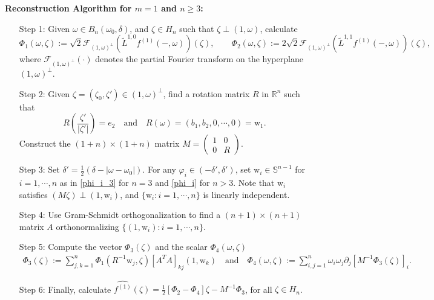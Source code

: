 \documentclass[11pt,a4paper,reqno]{amsart}
\newcommand{\Rn}{\mathbb{R}^n}
\newcommand{\om}{\omega}
\newcommand{\sn}{\mathbb{S}^{n-1}}
\newcommand{\w}{\mathrm{w}}
\begin{document}
	\noindent \textbf{Reconstruction Algorithm for $m = 1$ and $n\geq 3$:}
	\begin{enumerate}\setlength\itemsep{3mm}
		\item[Step 1:] Given $\om \in B_n(\om_0,\delta)$, and $\zeta \in H_n$ such that $\zeta \perp (1,\om)$, calculate
		\[  \Phi_1 (\om,\zeta):=  \sqrt{2} \mathcal{F}_{(1,\om)^{\perp}}(\tilde{L}^{1,0}f^{(1)}(-,\om))(\zeta), \qquad
		\Phi_2 (\om,\zeta):= 2\sqrt{2} \mathcal{F}_{(1,\om)^{\perp}}(\tilde{L}^{1,1}f^{(1)}(-,\om))(\zeta),    \]
		where $\mathcal{F}_{(1,\om)^{\perp}}(\cdot)$ denotes the partial Fourier transform on the hyperplane $(1,\om)^{\perp}$.
		
		
		
		\item[Step 2:] Given $\zeta = (\zeta_0,\zeta') \in (1,\om)^{\perp}$, find a rotation matrix $R$ in $\Rn$ such that
		\[
		R\left(\frac{\zeta'}{|\zeta'|}\right) = e_2 \quad \mbox{and}\quad 
		R(\om) = (b_1,b_2,0,\cdots,0)=\w_1.
		\] 
		Construct the $(1+n)\times(1+n)$ matrix 
		$M = \begin{pmatrix}
			1 &0\\ 0 &R
		\end{pmatrix}$.
		
	
		
		\item[Step 3:]  Set $\delta' = \frac{1}{2}\left(\delta-|\om-\om_0|\right)$. For any $\varphi_i \in (-\delta',\delta')$, set $\w_i \in \sn$ for $i=1,\cdots,n$ as in \eqref{phi_i_3} for $n=3$ and \eqref{phi_i} for $n>3$.
		Note that $\w_i$ satisfies $(M\zeta) \perp (1,\w_i)$, and $\{\w_i : i=1,\cdots,n\}$ is linearly independent.

        \item[Step 4:] Use Gram-Schmidt orthogonalization to find a $(n+1)\times(n+1)$ matrix $A$ orthonormalizing 
		$\{(1,\w_i) : i=1,\cdots,n\}$.
		
		\item[Step 5:] Compute the vector $\Phi_3(\zeta)$ and the scalar $\Phi_4(\om,\zeta)$
		\begin{align}\label{eq_3}
	\Phi_3(\zeta) := \sum_{j,k=1}^{n}\Phi_{1}(R^{-1}\w_j,\zeta)[A^TA]_{kj}(1,\w_k)
\quad \mbox{and}\quad 
\Phi_4(\om,\zeta) := \sum_{i,j=1}^n\om_i \om_j\partial_j [M^{-1}\Phi_3(\zeta)]_i.  
		\end{align}
        
    
		
		\item[Step 6:] Finally, calculate
        \quad $\widehat{f^{(1)}}(\zeta)=\frac{1}{2}[\Phi_2-\Phi_4]\zeta - M^{-1}\Phi_3$,  for all $\zeta \in H_n$.
		\end{enumerate}
	
\end{document}
